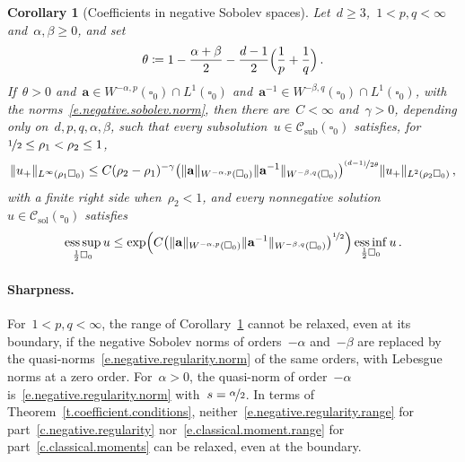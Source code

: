 \documentclass[11pt,letterpaper]{article}
\numberwithin{equation}{section}
\newtheorem{corollaryA}[theoremA]{Corollary}
\theoremstyle{definition}
\renewcommand{\a}{\mathbf{a}}
\newcommand{\nf}{\nicefrac}
\newcommand{\cu}{\square}
\DeclareMathOperator*{\esssup}{ess\,sup}
\DeclareMathOperator*{\essinf}{ess\,inf}
\DeclarePairedDelimiter{\norm}{\lVert}{\rVert}
\newcommand{\Csol}{\mathcal C_{\mathrm{sol}}}
\newcommand{\Csub}{\mathcal C_{\mathrm{sub}}}
\begin{document}
\begin{corollaryA}[Coefficients in negative Sobolev spaces]
\label{c.sobolev.coefficients}
Let~$d\geq3$,~$1<p,q<\infty$ and~$\alpha,\beta\geq0$, and set
\begin{equation*}
	\theta\coloneqq1-\frac{\alpha+\beta}2-\frac{d-1}2\Bigl(\frac1p+\frac1q\Bigr)\,.
\end{equation*}
If~$\theta>0$ and~$\a\in W^{-\alpha,p}(\cu_0)\cap L^1(\cu_0)$ and~$\a^{-1}\in W^{-\beta,q}(\cu_0)\cap L^1(\cu_0)$, with the norms~\eqref{e.negative.sobolev.norm}, then there are~$C<\infty$ and~$\gamma>0$, depending only on~$d,p,q,\alpha,\beta$, such that every subsolution~$u\in\Csub(\cu_0)$ satisfies, for~$\nf12\leq\rho_1<\rho_2\leq1$,
\begin{equation}
	\norm{u_+}_{L^\infty(\rho_1\cu_0)}\leq C(\rho_2-\rho_1)^{-\gamma}\bigl(\norm{\a}_{W^{-\alpha,p}(\cu_0)}\norm{\a^{-1}}_{W^{-\beta,q}(\cu_0)}\bigr)^{\nf{(d-1)}{2\theta}}\norm{u_+}_{L^2(\rho_2\cu_0)}\,,
	\label{e.sobolev.local.boundedness}
\end{equation}
with a finite right side when~$\rho_2<1$, and every nonnegative solution~$u\in\Csol(\cu_0)$ satisfies
\begin{equation}
	\esssup_{\frac12\cu_0}u\leq\exp\Bigl(C\bigl(\norm{\a}_{W^{-\alpha,p}(\cu_0)}\norm{\a^{-1}}_{W^{-\beta,q}(\cu_0)}\bigr)^{\nf12}\Bigr)\essinf_{\frac12\cu_0}u\,.
	\label{e.sobolev.harnack}
\end{equation}

\end{corollaryA}

\paragraph{Sharpness.} For~$1<p,q<\infty$, the range of Corollary~\ref{c.sobolev.coefficients} cannot be relaxed, even at its boundary, if the negative Sobolev norms of orders~$-\alpha$ and~$-\beta$ are replaced by the quasi-norms~\eqref{e.negative.regularity.norm} of the same orders, with Lebesgue norms at a zero order. For~$\alpha>0$, the quasi-norm of order~$-\alpha$ is~\eqref{e.negative.regularity.norm} with~$s=\nf\alpha2$. In terms of Theorem~\ref{t.coefficient.conditions}, neither~\eqref{e.negative.regularity.range} for part~\ref{c.negative.regularity} nor~\eqref{e.classical.moment.range} for part~\ref{c.classical.moments} can be relaxed, even at the boundary.
\end{document}
